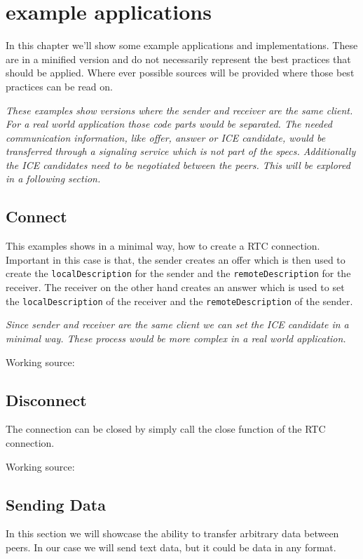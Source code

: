 \section{example applications}
In this chapter we'll show some example applications and implementations. These are in a minified version and do not necessarily represent the best practices that should be applied. Where ever possible sources will be provided where those best practices can be read on.

\textit{These examples show versions where the sender and receiver are the same client. For a real world application those code parts would be separated. The needed communication information, like offer, answer or ICE candidate, would be transferred through a signaling service which is not part of the  specs. Additionally the ICE candidates need to be negotiated between the peers. This will be explored in a following section.}

\subsection{Connect}
This examples shows in a minimal way, how to create a RTC connection. Important in this case is that, the sender creates an offer which is then used to create the \lstinline[basicstyle=\ttfamily\color{black}]|localDescription| for the sender and the \lstinline[basicstyle=\ttfamily\color{black}]|remoteDescription| for the receiver. The receiver on the other hand creates an answer which is used to set the \lstinline[basicstyle=\ttfamily\color{black}]|localDescription| of the receiver and the \lstinline[basicstyle=\ttfamily\color{black}]|remoteDescription| of the sender.

\textit{Since sender and receiver are the same client we can set the ICE candidate in a minimal way. These process would be more complex in a real world application.}

Working source:~\autocite{webrtc:connect}

\subsection{Disconnect}
The connection can be closed by simply call the close function of the RTC connection.

Working source:~\autocite{webrtc:disconnect}

\subsection{Sending Data}
In this section we will showcase the ability to transfer arbitrary data between peers. In our case we will send text data, but it could be data in any format.

